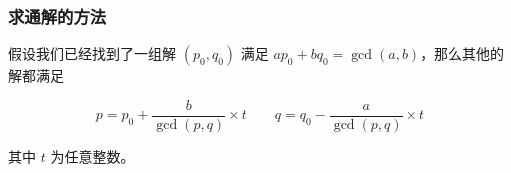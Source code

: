 \subsubsection{求通解的方法}

假设我们已经找到了一组解 $(p_0, q_0)$ 满足 $a p_0 + b q_0 = \gcd(a,b)$，那么其他的解都满足

$$p = p_0 + \frac b {\gcd(p, q)} \times t\quad\quad q = q_0 - \frac a {\gcd(p, q)} \times t$$

其中 $t$ 为任意整数。
